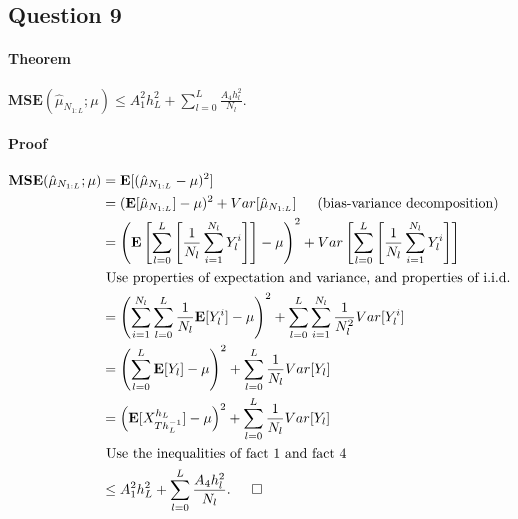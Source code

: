 \documentclass{article}
\begin{document}
\subsection{Question 9}
\paragraph{Theorem} $\textbf{MSE}(\hat\mu_{N_{1:L}};\mu) \leq A_1^2h_L^2 + \sum_{l=0}^L \frac{A_4 h_l^2}{N_l}.$
\paragraph{Proof} 

\begin{equation*}
\begin{split}
\textbf{MSE}(\hat\mu_{N_{1:L}};\mu) &= \textbf{E}[(\hat\mu_{N_{1:L}}-\mu)^2] \\
&= (\textbf{E}[\hat\mu_{N_{1:L}}]-\mu)^2 + Var[\hat\mu_{N_{1:L}}] \indent{} \text{(bias-variance decomposition)} \\ 
&= \left( \textbf{E} \left[ \sum_{l=0}^L \left[ \frac{1}{N_l} \sum_{i=1}^{N_l} Y_l^i \right] \right]-\mu \right)^2 + Var \left[ \sum_{l=0}^L \left[ \frac{1}{N_l} \sum_{i=1}^{N_l} Y_l^i \right] \right] \\
& \text{ Use properties of expectation and variance, and properties of i.i.d.} \\
&= \left( \sum_{i=1}^{N_l} \sum_{l=0}^L \frac{1}{N_l} \textbf{E}[Y_l^i]-\mu \right)^2 + \sum_{l=0}^L \sum_{i=1}^{N_l}  \frac{1}{N_l^2} Var[Y_l^i] \\
&= \left( \sum_{l=0}^L \textbf{E}[Y_l]-\mu \right)^2 + \sum_{l=0}^L \frac{1}{N_l} Var[Y_l] \\
&= \left( \textbf{E}[X_{Th_L^{-1}}^{h_L}]-\mu \right)^2 + \sum_{l=0}^L \frac{1}{N_l} Var[Y_l] \\
& \text{ Use the inequalities of fact 1 and fact 4} \\
&\leq A_1^2h_L^2 + \sum_{l=0}^L \frac{A_4 h_l^2}{N_l}. \indent{} \Box \\
\end{split}
\end{equation*}
\end{document}
